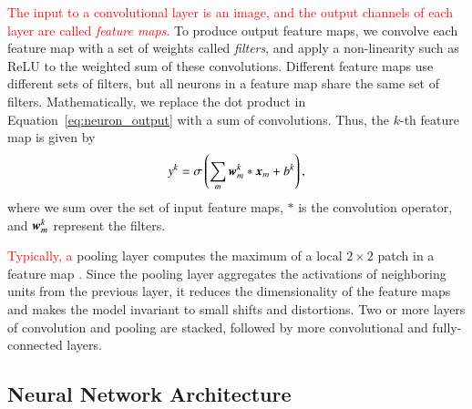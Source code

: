\documentclass[fleqn,usenatbib]{mnras}
\newcommand{\changed}[1]{\textcolor{red}{#1}}
\begin{document}
\changed{
The input to a convolutional layer is an image, and the output channels of
each layer are called \textit{feature maps}.
}
To produce output feature maps, we convolve each feature map with a set of weights
called \textit{filters},
and apply a non-linearity such as ReLU to the weighted sum of these convolutions.
Different feature maps use different sets of filters,
but all neurons in a feature map share the same set of filters.
Mathematically, we replace the dot product in Equation~\ref{eq:neuron_output}
with a sum of convolutions. Thus, the $k$-th feature map is given by
\begin{equation}
  y^k = \sigma \left( \sum_{m} \bmath{w}_m^k \ast \bmath{x}_m + b^k \right),
\end{equation}
where we sum over the set of input feature maps,
$\ast$ is the convolution operator, and $\bmath{w}_m^k$ represent the filters.

\changed{
Typically, a
}
pooling layer computes the maximum of a local $2\times2$ patch in a feature map
\changed{
\citep{krizhevsky2012imagenet}.
}
Since the pooling layer aggregates the activations of neighboring units from the previous layer,
it reduces the dimensionality of the feature maps and
makes the model invariant to small shifts and distortions.
Two or more layers of convolution and pooling are stacked,
followed by more convolutional and fully-connected layers.

\subsection{Neural Network Architecture}
\end{document}
